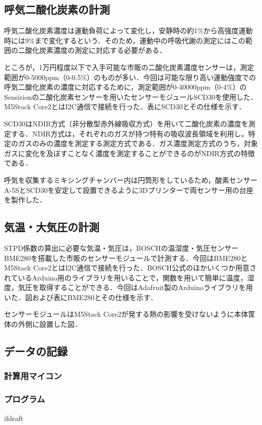\subsection{呼気二酸化炭素の計測}

呼気二酸化炭素濃度は運動負荷によって変化し，安静時の約1\%から高強度運動時には9\%まで変化するという\cite{co2_percent}．そのため，運動中の呼吸代謝の測定にはこの範囲の二酸化炭素濃度の測定に対応する必要がある．

ところが，1万円程度以下で入手可能な市販の二酸化炭素濃度センサーは，測定範囲が0-5000ppm（0-0.5\%）のものが多い．今回は可能な限り高い運動強度での呼気二酸化炭素の濃度に対応するために，測定範囲が0-40000ppm（0-4\%）のSensirionの二酸化炭素センサーを用いたセンサーモジュールSCD30を使用した．M5Stack Core2とはI2C通信で接続を行った．表にSCD30とその仕様を示す．

SCD30はNDIR方式（非分散型赤外線吸収方式）を用いて二酸化炭素の濃度を測定する．NDIR方式は，それぞれのガスが持つ特有の吸収波長領域を利用し，特定のガスのみの濃度を測定する測定方式である．ガス濃度測定方式のうち，対象ガスに変化を及ぼすことなく濃度を測定することができるのがNDIR方式の特徴である\cite{whats_ndir}．

呼気を収集するミキシングチャンバー内は円筒形をしているため，酸素センサーA-5SとSCD30を安定して設置できるように3Dプリンターで両センサー用の台座を製作した．



\subsection{気温・大気圧の計測}

STPD係数の算出に必要な気温・気圧は，BOSCHの温湿度・気圧センサーBME280を搭載した市販のセンサーモジュールで計測する．今回はBME280とM5Stack Core2とはI2C通信で接続を行った．BOSCH公式のほかいくつか用意されているArduino用のライブラリを用いることで，関数を用いて簡単に温度，湿度，気圧を取得することができる．今回はAdafruit製のArduinoライブラリを用いた．図および表にBME280とその仕様を示す．

センサーモジュールはM5Stack Core2が発する熱の影響を受けないように本体筐体の外側に設置した図．

\subsection{データの記録}

\subsubsection{計算用マイコン}

\subsubsection{プログラム}

\expandafter\ifx\csname ifdraft\endcsname\relax
  
\fi
